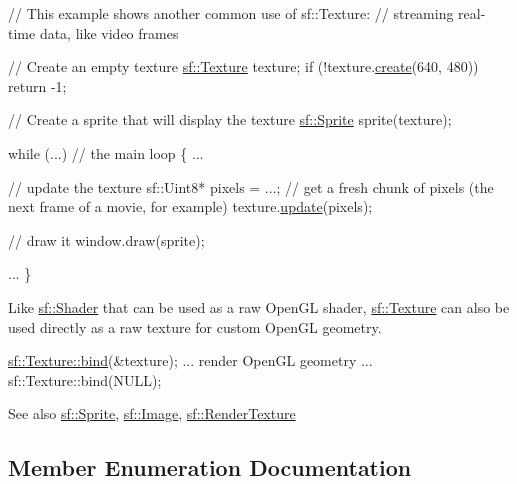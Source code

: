 \begin{DoxyCode}
\textcolor{comment}{// This example shows another common use of sf::Texture:}
\textcolor{comment}{// streaming real-time data, like video frames}

\textcolor{comment}{// Create an empty texture}
\hyperlink{classsf_1_1_texture}{sf::Texture} texture;
\textcolor{keywordflow}{if} (!texture.\hyperlink{classsf_1_1_texture_a89b4c7d204acf1033c3a1b6e0a3ad0a3}{create}(640, 480))
    \textcolor{keywordflow}{return} -1;

\textcolor{comment}{// Create a sprite that will display the texture}
\hyperlink{classsf_1_1_sprite}{sf::Sprite} sprite(texture);

\textcolor{keywordflow}{while} (...) \textcolor{comment}{// the main loop}
\{
    ...

    \textcolor{comment}{// update the texture}
    sf::Uint8* pixels = ...; \textcolor{comment}{// get a fresh chunk of pixels (the next frame of a movie, for example)}
    texture.\hyperlink{classsf_1_1_texture_ae4eab5c6781316840b0c50ad08370963}{update}(pixels);

    \textcolor{comment}{// draw it}
    window.draw(sprite);

    ...
\}
\end{DoxyCode}


Like \hyperlink{classsf_1_1_shader}{sf\+::\+Shader} that can be used as a raw Open\+GL shader, \hyperlink{classsf_1_1_texture}{sf\+::\+Texture} can also be used directly as a raw texture for custom Open\+GL geometry. 
\begin{DoxyCode}
\hyperlink{classsf_1_1_texture_ae9a4274e7b95ebf7244d09c7445833b0}{sf::Texture::bind}(&texture);
... render OpenGL geometry ...
sf::Texture::bind(NULL);
\end{DoxyCode}


\begin{DoxySeeAlso}{See also}
\hyperlink{classsf_1_1_sprite}{sf\+::\+Sprite}, \hyperlink{classsf_1_1_image}{sf\+::\+Image}, \hyperlink{classsf_1_1_render_texture}{sf\+::\+Render\+Texture} 
\end{DoxySeeAlso}


\subsection{Member Enumeration Documentation}
\mbox{\label{classsf_1_1_texture_aa6fd3bbe3c334b3c4428edfb2765a82e}} 
